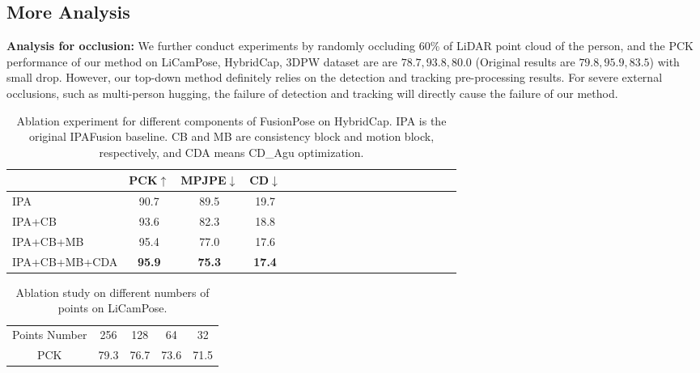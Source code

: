 \documentclass[letterpaper]{article} %
\begin{document}
\subsection{More Analysis}

\noindent \textbf{Analysis for occlusion:} We further conduct experiments by randomly occluding 60\% of LiDAR point cloud of the person, and the PCK performance of our method on LiCamPose, HybridCap, 3DPW dataset are are $78.7, 93.8, 80.0$ (Original results are $79.8,95.9,83.5$) with small drop. However, our top-down method definitely relies on the detection and tracking pre-processing results. For severe external occlusions, such as multi-person hugging, the failure of detection and tracking will directly cause the failure of our method. 


\begin{table}[ht]
 \centering
    \caption{Ablation experiment for different components of FusionPose on HybridCap. IPA is the original IPAFusion baseline. CB and MB are consistency block and motion block, respectively,  and CDA means CD\_Agu optimization.}
     \label{tab:ablation2}
    \setlength{\tabcolsep}{0.5mm}
\begin{tabular}{lcccccccccccccccccc}
\hline   
\multicolumn{1}{c}{}        &\multicolumn{1}{c}{PCK$\uparrow$}         &\multicolumn{1}{c}{MPJPE$\downarrow$}         &\multicolumn{1}{c}{CD$\downarrow$}    
         \\\hline
     IPA                 & 90.7                            &           89.5 & 19.7       
                  
\\
        IPA+CB               &      93.6                        &          82.3 & 18.8               
   
\\
IPA+CB+MB                  &    95.4                          &   77.0 & 17.6 
\\IPA+CB+MB+CDA             &       \textbf{95.9}                       &            \textbf{75.3}               & \textbf{17.4} 

\\\hline
\end{tabular}
\end{table}

\begin{table}[ht]
\centering
    \caption{Ablation study on different numbers of points on LiCamPose.}
    \label{tab:ablation-density}
    \begin{tabular}{ccccc}
    \hline
    Points Number &256  & 128  & 64   & 32   \\
    PCK & 79.3 & 76.7 & 73.6 & 71.5\\
    \hline
    \end{tabular}
\end{table}
\end{document}

